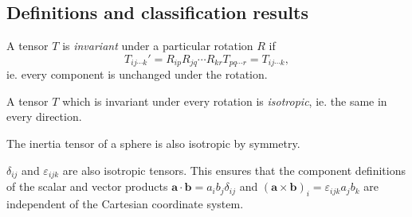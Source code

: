 \documentclass[a4paper]{article}
\begin{document}
\subsection{Definitions and classification results}
\begin{defi}
  A tensor $T$ is \emph{invariant} under a particular rotation $R$ if
  \[
    T_{ij\cdots k}' = R_{ip}R_{jq}\cdots R_{kr}T_{pq\cdots r} = T_{ij\cdots k},
  \]
  ie. every component is unchanged under the rotation.

  A tensor $T$ which is invariant under every rotation is \emph{isotropic}, ie. the same in every direction.
\end{defi}

\begin{eg}
  The inertia tensor of a sphere is also isotropic by symmetry.

  $\delta_{ij}$ and $\varepsilon_{ijk}$ are also isotropic tensors. This ensures that the component definitions of the scalar and vector products $\mathbf{a}\cdot \mathbf{b} = a_i b_j \delta_{ij}$ and $(\mathbf{a}\times \mathbf{b})_i = \varepsilon_{ijk} a_j b_k$ are independent of the Cartesian coordinate system.
\end{eg}
\end{document}
